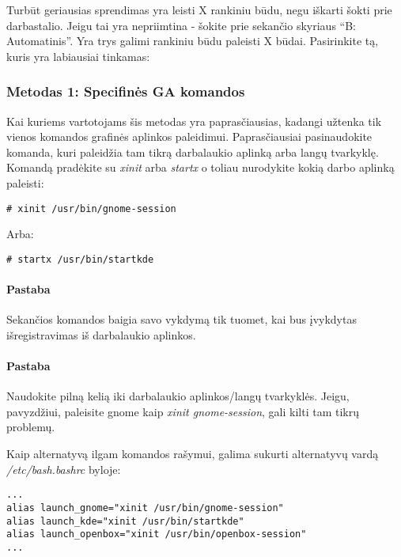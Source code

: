       Turbūt geriausias sprendimas yra leisti X rankiniu būdu, negu
      iškarti šokti prie darbastalio. Jeigu tai yra nepriimtina -
      šokite prie sekančio skyriaus ``B: Automatinis''. Yra trys
      galimi rankiniu būdu paleisti X būdai. Pasirinkite tą, kuris yra
      labiausiai tinkamas:

      \subsubsection{Metodas 1: Specifinės GA komandos}

        Kai kuriems vartotojams šis metodas yra paprasčiausias,
        kadangi užtenka tik vienos komandos grafinės aplinkos
        paleidimui. Paprasčiausiai pasinaudokite komanda, kuri
        paleidžia tam tikrą darbalaukio aplinką arba langų
        tvarkyklę. Komandą pradėkite su \textsl{xinit} arba
        \textsl{startx} o toliau nurodykite kokią darbo aplinką
        paleisti:

        \begin{verbatim}
# xinit /usr/bin/gnome-session
        \end{verbatim}

        Arba:

        \begin{verbatim}
# startx /usr/bin/startkde
        \end{verbatim}

        \paragraph{Pastaba} Sekančios komandos baigia savo vykdymą tik
        tuomet, kai bus įvykdytas išregistravimas iš darbalaukio
        aplinkos.

        \paragraph{Pastaba} Naudokite pilną kelią iki darbalaukio
        aplinkos/langų tvarkyklės. Jeigu, pavyzdžiui, paleisite gnome
        kaip \textsl{xinit gnome-session}, gali kilti tam tikrų
        problemų.

        Kaip alternatyvą ilgam komandos rašymui, galima sukurti
        alternatyvų vardą \textsl{/etc/bash.bashrc} byloje:

        \begin{verbatim}
...
alias launch_gnome="xinit /usr/bin/gnome-session"
alias launch_kde="xinit /usr/bin/startkde"
alias launch_openbox="xinit /usr/bin/openbox-session"
...
        \end{verbatim}

